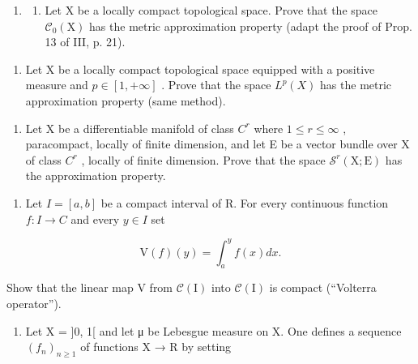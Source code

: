 \begin{enumerate}
\def\labelenumi{\arabic{enumi})}
\setcounter{enumi}{35}
\tightlist
\item
  \begin{enumerate}
  \def\labelenumii{\alph{enumii})}
  \tightlist
  \item
    Let X be a locally compact topological space. Prove that the space \(\mathcal{C}_{0}(\mathrm{X})\) has the metric approximation property (adapt the proof of Prop. 13 of III, p. 21).
  \end{enumerate}
\end{enumerate}

\begin{enumerate}
\def\labelenumi{\alph{enumi})}
\setcounter{enumi}{1}
\tightlist
\item
  Let X be a locally compact topological space equipped with a positive measure and \(p \in [1, +\infty]\) . Prove that the space \(L^{p}(X)\) has the metric approximation property (same method).
\end{enumerate}

\begin{enumerate}
\def\labelenumi{\arabic{enumi})}
\setcounter{enumi}{36}
\tightlist
\item
  Let X be a differentiable manifold of class \(C^{r}\) where \(1 \leqslant r \leqslant \infty\) , paracompact, locally of finite dimension, and let E be a vector bundle over X of class \(C^{r}\) , locally of finite dimension. Prove that the space \(\mathcal{S}^{r}(\mathrm{X};\mathrm{E})\) has the approximation property.
\end{enumerate}

\exercisesection{}

\begin{enumerate}
\def\labelenumi{\arabic{enumi})}
\tightlist
\item
  Let \(I = [a, b]\) be a compact interval of R. For every continuous function \(f: I \to C\) and every \(y \in I\) set
\end{enumerate}

\[
\mathrm{V} (f) (y) = \int_ {a} ^ {y} f (x) d x.
\]

Show that the linear map V from \(\mathcal{C}(\mathrm{I})\) into \(\mathcal{C}(\mathrm{I})\) is compact (“Volterra operator”).

\begin{enumerate}
\def\labelenumi{\arabic{enumi})}
\setcounter{enumi}{1}
\tightlist
\item
  Let X = {]}0, 1{[} and let μ be Lebesgue measure on X. One defines a sequence \((f_{n})_{n \geqslant 1}\) of functions X → R by setting
\end{enumerate}

